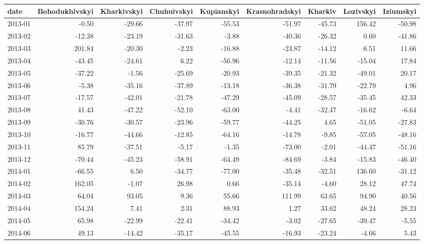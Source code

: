 \begin{table}[ht]
\centering
\begin{tabular}{lrrrrrrrr}
  \hline
date & Bohodukhivskyi & Kharkivskyi & Chuhuivskyi & Kupianskyi & Krasnohradskyi & Kharkiv & Lozivskyi & Iziumskyi \\ 
  \hline
2013-01 & -0.50 & -29.66 & -37.97 & -55.53 & -51.97 & -45.73 & 156.42 & -50.98 \\ 
  2013-02 & -12.38 & -23.19 & -31.63 & -3.88 & -40.36 & -26.32 & 0.60 & -41.86 \\ 
  2013-03 & 201.84 & -20.30 & -2.23 & -16.88 & -23.87 & -14.12 & 6.51 & 11.66 \\ 
  2013-04 & -43.45 & -24.61 & 6.22 & -56.96 & -12.14 & -11.56 & -15.04 & 17.84 \\ 
  2013-05 & -37.22 & -1.56 & -25.69 & -20.93 & -39.35 & -21.32 & -49.01 & 20.17 \\ 
  2013-06 & -5.38 & -35.16 & -37.89 & -13.18 & -36.38 & -31.79 & -22.79 & 4.96 \\ 
  2013-07 & -17.57 & -42.01 & -21.78 & -47.29 & -45.09 & -28.57 & -35.45 & 42.33 \\ 
  2013-08 & 41.43 & -47.22 & -52.10 & -63.00 & -4.41 & -32.47 & -16.62 & -6.64 \\ 
  2013-09 & -30.76 & -30.57 & -23.96 & -59.77 & -44.25 & 4.65 & -51.05 & -27.83 \\ 
  2013-10 & -16.77 & -44.66 & -12.85 & -64.16 & -14.78 & -9.85 & -57.05 & -48.16 \\ 
  2013-11 & 85.79 & -37.51 & -5.17 & -1.35 & -73.00 & -2.01 & -44.47 & -51.16 \\ 
  2013-12 & -70.44 & -45.23 & -58.91 & -64.49 & -84.69 & -3.84 & -15.83 & -46.40 \\ 
  2014-01 & -66.55 & 6.50 & -34.77 & -77.00 & -35.48 & -32.51 & 136.60 & -31.12 \\ 
  2014-02 & 162.05 & -1.07 & 26.98 & 0.66 & -35.14 & -4.60 & 28.12 & 47.74 \\ 
  2014-03 & 64.04 & 93.05 & 9.36 & 55.66 & 111.99 & 63.65 & 94.90 & 40.56 \\ 
  2014-04 & 154.24 & 7.41 & 2.31 & 88.93 & 1.27 & 33.62 & 48.24 & 28.23 \\ 
  2014-05 & 65.98 & -22.99 & -22.41 & -34.42 & -3.02 & -27.65 & -39.47 & -5.55 \\ 
  2014-06 & 49.13 & -14.42 & -35.17 & -45.55 & -16.93 & -23.24 & -4.66 & 5.43 \\ 

\end{tabular}
\end{table}
